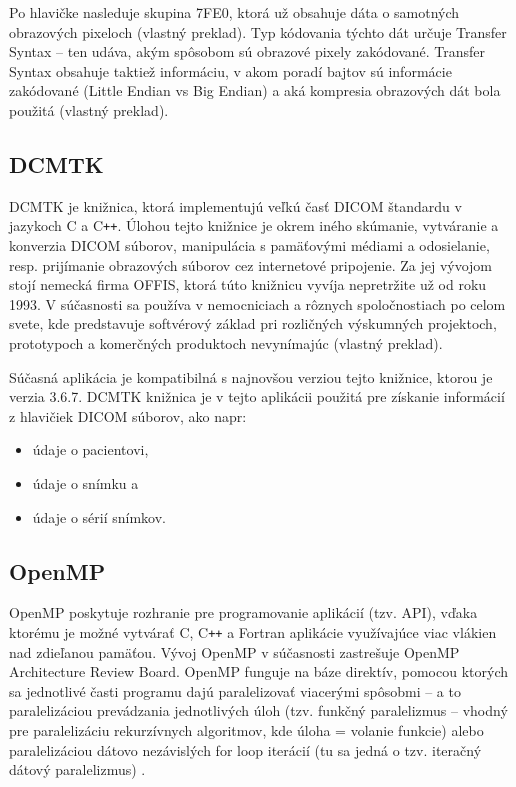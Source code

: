 Po hlavičke nasleduje skupina 7FE0, ktorá už obsahuje dáta o samotných obrazových pixeloch \cite{Varma_2012} (vlastný preklad). Typ kódovania týchto dát určuje Transfer Syntax -- ten udáva, akým spôsobom sú obrazové pixely zakódované. Transfer Syntax obsahuje taktiež informáciu, v akom poradí bajtov sú informácie zakódované (Little Endian vs Big Endian) a aká kompresia obrazových dát bola použitá \cite{dicom_transfer_syntax} (vlastný preklad).

\subsection {DCMTK}\label{dcmtk}

DCMTK je knižnica, ktorá implementujú veľkú časť DICOM štandardu v jazykoch C a C\texttt{++}. Úlohou tejto knižnice je okrem iného skúmanie, vytváranie a konverzia DICOM súborov, manipulácia s pamäťovými médiami a odosielanie, resp. prijímanie obrazových súborov cez internetové pripojenie. Za jej vývojom stojí nemecká firma OFFIS, ktorá túto knižnicu vyvíja nepretržite už od roku 1993. V súčasnosti sa používa v nemocniciach a rôznych spoločnostiach po celom svete, kde predstavuje softvérový základ pri rozličných výskumných projektoch, prototypoch a komerčných produktoch nevynímajúc \cite{dcmtk_description} (vlastný preklad). \newline

Súčasná aplikácia je kompatibilná s najnovšou verziou tejto knižnice, ktorou je verzia 3.6.7. DCMTK knižnica je v tejto aplikácii použitá pre získanie informácií z hlavičiek DICOM súborov, ako napr:

\begin{itemize}
\item {údaje o pacientovi,}
\item {údaje o snímku a}
\item {údaje o sérií snímkov.}
\end{itemize}

\subsection {OpenMP}

OpenMP poskytuje rozhranie pre programovanie aplikácií (tzv. API), vďaka ktorému je možné vytvárať C, C\texttt{++} a Fortran aplikácie využívajúce viac vlákien nad zdieľanou pamäťou. Vývoj OpenMP v súčasnosti zastrešuje OpenMP Architecture Review Board.
OpenMP funguje na báze direktív, pomocou ktorých sa jednotlivé časti programu dajú paralelizovať viacerými spôsobmi -- a to paralelizáciou prevádzania jednotlivých úloh (tzv. funkčný paralelizmus -- vhodný pre paralelizáciu rekurzívnych algoritmov, kde úloha = volanie funkcie) alebo paralelizáciou dátovo nezávislých for loop iterácií (tu sa jedná o tzv. iteračný dátový paralelizmus) \cite{openmp_description}.

